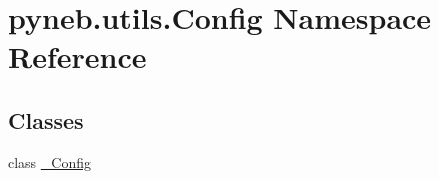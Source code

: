 \hypertarget{namespacepyneb_1_1utils_1_1_config}{}\section{pyneb.\+utils.\+Config Namespace Reference}
\label{namespacepyneb_1_1utils_1_1_config}
\subsection*{Classes}
\begin{DoxyCompactItemize}
\item 
class \hyperlink{classpyneb_1_1utils_1_1_config_1_1___config}{\+\_\+\+Config}
\end{DoxyCompactItemize}
